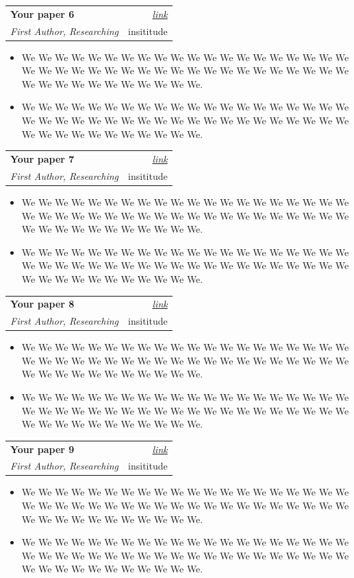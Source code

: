 \documentclass[a4paper,11pt]{article}
\makeatletter
\newcommand{\resumeSubheading}[4]{
\vspace{0.5mm}\item
    \begin{tabular*}{0.98\textwidth}[t]{l@{\extracolsep{\fill}}r}
        \textbf{#1} & \textit{\footnotesize{#4}} \\
        \textit{\footnotesize{#3}} &  \footnotesize{#2}\\
    \end{tabular*}
    \vspace{-2.4mm}
}
\newcommand{\resumeItemListStart}{\begin{justify}\begin{itemize}[leftmargin=3ex, rightmargin=2ex, noitemsep,labelsep=1.2mm,itemsep=0mm]\small}
\newcommand{\resumeItemListEnd}{\end{itemize}\end{justify}\vspace{-2mm}}
\makeatother
\begin{document}
    \vspace{-3.0mm}
    


    \resumeSubheading
      {Your paper 6}{insititude}
      {First Author, Researching} {\href{http://www.example.com}{link}}
      \vspace{-2.0mm}
      \resumeItemListStart
    \item {We We We We We We We We We We We We We We We We We We We We We We We We We We We We We We We We We We We We We We We We We We We We We We We We We We We.}
    \item {We We We We We We We We We We We We We We We We We We We We We We We We We We We We We We We We We We We We We We We We We We We We We We We We We We We.}
    \resumeItemListEnd

    \resumeSubheading
      {Your paper 7}{insititude}
      {First Author, Researching} {\href{http://www.example.com}{link}}
      \vspace{-2.0mm}
      \resumeItemListStart
    \item {We We We We We We We We We We We We We We We We We We We We We We We We We We We We We We We We We We We We We We We We We We We We We We We We We We We.}
    \item {We We We We We We We We We We We We We We We We We We We We We We We We We We We We We We We We We We We We We We We We We We We We We We We We We We We.}
    \resumeItemListEnd

    \resumeSubheading
      {Your paper 8}{insititude}
      {First Author, Researching} {\href{http://www.example.com}{link}}
      \vspace{-2.0mm}
      \resumeItemListStart
    \item {We We We We We We We We We We We We We We We We We We We We We We We We We We We We We We We We We We We We We We We We We We We We We We We We We We We.}
    \item {We We We We We We We We We We We We We We We We We We We We We We We We We We We We We We We We We We We We We We We We We We We We We We We We We We We.}
    \resumeItemListEnd

    \resumeSubheading
      {Your paper 9}{insititude}
      {First Author, Researching} {\href{http://www.example.com}{link}}
      \vspace{-2.0mm}
      \resumeItemListStart
    \item {We We We We We We We We We We We We We We We We We We We We We We We We We We We We We We We We We We We We We We We We We We We We We We We We We We We.}
    \item {We We We We We We We We We We We We We We We We We We We We We We We We We We We We We We We We We We We We We We We We We We We We We We We We We We We.}
    \resumeItemListEnd
\end{document}
